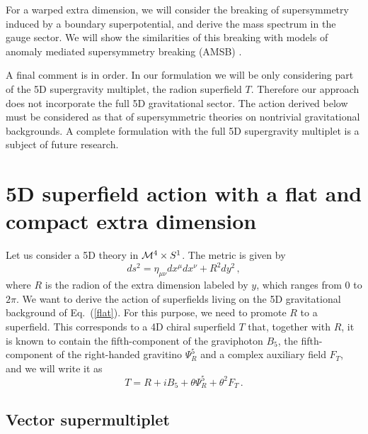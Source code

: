 \documentclass[a4paper,12pt]{article}
\newcommand{\Ft}{F_{T}}
\begin{document}
For a warped extra dimension, we will consider the 
breaking of supersymmetry induced by a  boundary superpotential,
and derive the mass spectrum in the gauge sector.
We will show the similarities of this  breaking
with
 models of anomaly mediated supersymmetry breaking (AMSB) 
\cite{amsb}.

A final comment is in order.
In our formulation we will be only considering part 
of the 5D supergravity multiplet, 
the radion superfield $T$. 
Therefore our approach does not incorporate the full
5D gravitational sector.
The action derived below
must be considered as that of 
supersymmetric theories on  nontrivial gravitational backgrounds.
A complete formulation with the full 5D supergravity multiplet is
a subject of future research.



\section{5D superfield action with  a flat and compact extra dimension}

Let us  consider a 5D theory  in ${\cal M}^4\times S^1$.
The  metric is given by
\begin{equation}
    ds^2 = \eta_{\mu\nu} dx^\mu dx^\nu + R^2 dy^2 \, ,
\label{flat}
\end{equation}
where $R$ is the radion of the extra dimension labeled by $y$, which
ranges from 0 to $2\pi$.  We want to derive the action of 
superfields living on the 5D gravitational background of
Eq.~(\ref{flat}).
For this purpose, we need to promote $R$ to a superfield.  
This
corresponds to a 4D chiral superfield $T$ that, together with $R$, it
is known to contain the fifth-component of the graviphoton $B_5$, the
fifth-component of the right-handed gravitino $\Psi_R^5$
and a complex auxiliary field $F_T$, and we will write it as
\begin{equation}
 T=  R + i B_{5} + \theta \Psi^5_R + \theta^{2} \Ft\, .
\end{equation}


\subsection{Vector supermultiplet}
\label{sec:gauge}
\end{document}
